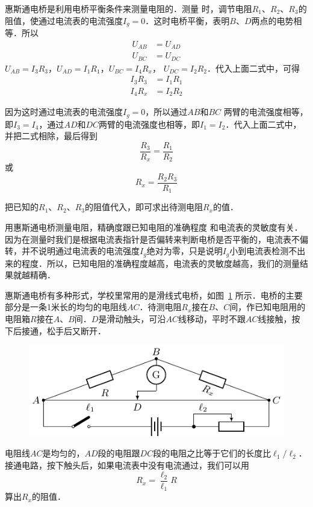 惠斯通电桥是利用电桥平衡条件来测量电阻的．测量
时，调节电阻$R_1$、$R_2$、$R_3$的阻值，使通过电流表的电流强度$I_g=0$．这时电桥平衡，表明$B$、$D$两点的电势相等．所以
\[\begin{split}
    U_{AB}&=U_{AD}\\
    U_{BC}&=U_{DC}
\end{split}\]
$U_{AB}=I_3R_3$，$U_{AD}=I_1R_1$，$U_{BC}=I_4R_x$， $U_{DC}=I_2R_2$．代入上面二式中，可得
\[\begin{split}
    I_3R_3&=I_1R_1\\
I_4R_x&=I_2R_2
\end{split}\]

因为这时通过电流表的电流强度$I_g=0$，所以通过$AB$和$BC$ 两臂的电流强度相等，即$I_3=I_4$，通过$AD$和$DC$两臂的电流强度也相等，即$I_1=I_2$．代入上面二式中，并把二式相除，最后得到
\[\frac{R_3}{R_x}=\frac{R_1}{R_2} \]
或\[R_x=\frac{R_2R_3}{R_1} \]

把已知的$R_1$、$R_2$、$R_3$的阻值代入，即可求出待测电阻$R_x$的值．

用惠斯通电桥测量电阻，精确度跟已知电阻的准确程度
和电流表的灵敏度有关．因为在测量时我们是根据电流表指针是否偏转来判断电桥是否平衡的，电流表不偏转，并不说明通过电流表的电流强度$I_g$绝对为零，只是说明$I_g$小到电流表检测不出来的程度．所以，已知电阻的准确程度越高，电流表的灵敏度越高，我们的测量结果就越精确．

惠斯通电桥有多种形式，学校里常用的是滑线式电桥，如图~\ref{fig_B_7-40} 所示．电桥的主要部分是一条1米长的均匀的电阻线$AC$．待测电阻$R_x$接在$B$、$C$间，作已知电阻用的电阻箱$R$接在$A$、$B$间．$D$是滑动触头，可沿$AC$线移动，平时不跟$AC$线接触，按下后接通，松手后又断开．

\begin{figure}[htbp]
    \centering
    \includegraphics{fig/B/7-40.pdf}
    \caption{}\label{fig_B_7-40}
\end{figure}

电阻线$AC$是均匀的，$AD$段的电阻跟$DC$段的电阻之比等于它们的长度比$\ell_1/\ell_2$．接通电路，按下触头后，如果电流表中没有电流通过，我们可以用
\[R_x=\frac{\ell_2}{\ell_1}R\]
算出$R_x$的阻值．


